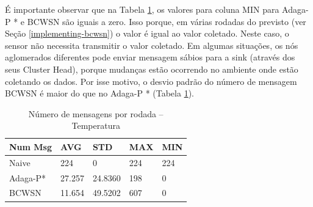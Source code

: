 \documentclass{acm_proc_article-sp}
\begin{document}
É importante observar que na Tabela \ref{tab:num-msg}, os valores para coluna
MIN para Adaga-P * e BCWSN são iguais a zero. Isso porque, em várias rodadas
do previsto (ver Seção \ref{implementing-bcwsn}) o valor é igual ao valor
coletado. Neste caso, o sensor não necessita transmitir o valor coletado.
Em algumas situações, os nós aglomerados diferentes pode enviar mensagem 
sábios para a sink (através dos seus Cluster Head), porque mudanças
estão ocorrendo no ambiente onde estão coletando os dados. Por isse motivo,
o desvio padrão do número de mensagem BCWSN é maior do que no Adaga-P * 
(Tabela \ref{tab:num-msg}).
\vspace*{-.3cm}

\begin{table}[h!]
\small
\caption{Número de mensagens por rodada – Temperatura}
\label{tab:num-msg}
\begin{center}
\begin{tabular}{|l||l|l|l|l|}
\hline
Num Msg &AVG &STD &MAX &MIN \\
\hline\hline
Naive &224 &0 &224 &224 \\
\hline
Adaga-P* &27.257 &24.8360 &198 &0 \\
\hline
BCWSN &11.654 &49.5202 &607 &0 \\
\hline
\end{tabular}
\end{center}
\end{table}
\vspace*{-.3cm}
\end{document}
